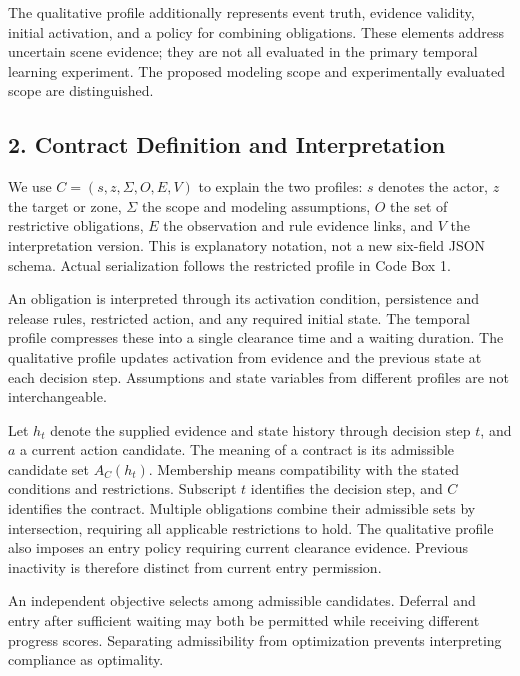 \documentclass[11pt,a4paper]{article}
\begin{document}
The qualitative profile additionally represents event truth, evidence validity, initial activation, and a policy for combining obligations. These elements address uncertain scene evidence; they are not all evaluated in the primary temporal learning experiment. The proposed modeling scope and experimentally evaluated scope are distinguished.\par

\subsection*{2. Contract Definition and Interpretation}

We use \(C = (s, z, \Sigma, O, E, V)\) to explain the two profiles: \(s\) denotes the actor, \(z\) the target or zone, \(\Sigma\) the scope and modeling assumptions, \(O\) the set of restrictive obligations, \(E\) the observation and rule evidence links, and \(V\) the interpretation version. This is explanatory notation, not a new six-field JSON schema. Actual serialization follows the restricted profile in Code Box 1.\par

An obligation is interpreted through its activation condition, persistence and release rules, restricted action, and any required initial state. The temporal profile compresses these into a single clearance time and a waiting duration. The qualitative profile updates activation from evidence and the previous state at each decision step. Assumptions and state variables from different profiles are not interchangeable.\par

Let \(h_t\) denote the supplied evidence and state history through decision step \(t\), and \(a\) a current action candidate. The meaning of a contract is its admissible candidate set \(A_C(h_t)\). Membership means compatibility with the stated conditions and restrictions. Subscript \(t\) identifies the decision step, and \(C\) identifies the contract. Multiple obligations combine their admissible sets by intersection, requiring all applicable restrictions to hold. The qualitative profile also imposes an entry policy requiring current clearance evidence. Previous inactivity is therefore distinct from current entry permission.\par

An independent objective selects among admissible candidates. Deferral and entry after sufficient waiting may both be permitted while receiving different progress scores. Separating admissibility from optimization prevents interpreting compliance as optimality.\par
\end{document}
